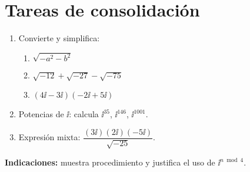 
\section*{Tareas de consolidación}
\begin{enumerate}[label=\textbf{Tarea \arabic*.}, leftmargin=1.25cm]
  \item Convierte y simplifica:
    \begin{enumerate}[label=\alph*)]
      \item \(\sqrt{-a^2-b^2}\)
      \item \(\sqrt{-12}+\sqrt{-27}-\sqrt{-75}\)
      \item \((4\ii-3\ii)(-2\ii+5\ii)\)
    \end{enumerate}
  \item Potencias de \(\ii\): calcula \(\ii^{35}\), \(\ii^{146}\), \(\ii^{1001}\).
  \item Expresión mixta: \(\dfrac{(3\ii)(2\ii)(-5\ii)}{\sqrt{-25}}\).
\end{enumerate}

\bigskip
\noindent\textbf{Indicaciones:} muestra procedimiento y justifica el uso de \(\ii^{n\bmod 4}\).